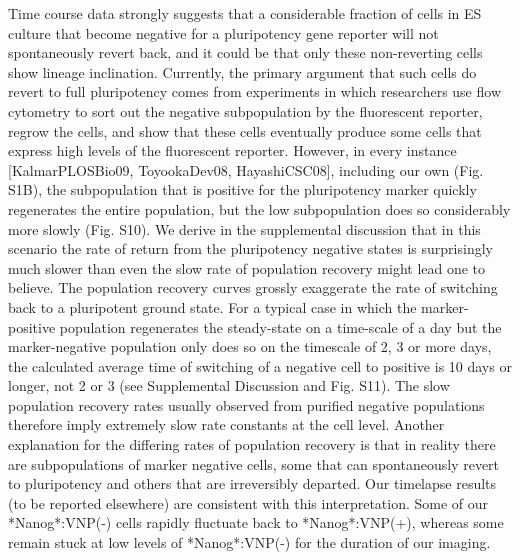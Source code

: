 \documentclass[aps,prl,twocolumn,superscriptaddress]{revtex4}
\begin{document}
Time course data strongly suggests that a considerable fraction of cells in ES culture that become negative for a pluripotency gene reporter will not spontaneously revert back, and it could be that only these non-reverting cells show lineage inclination. Currently, the primary argument that such cells do revert to full pluripotency comes from experiments in which researchers use flow cytometry to sort out the negative subpopulation by the fluorescent reporter, regrow the cells, and show that these cells eventually produce some cells that express high levels of the fluorescent reporter. However, in every instance [KalmarPLOSBio09, ToyookaDev08, HayashiCSC08], including our own (Fig. S1B), the subpopulation that is positive for the pluripotency marker quickly regenerates the entire population, but the low subpopulation does so considerably more slowly (Fig. S10). We derive in the supplemental discussion that in this scenario the rate of return from the pluripotency negative states is surprisingly much slower than even the slow rate of population recovery might lead one to believe. The population recovery curves grossly exaggerate the rate of switching back to a pluripotent ground state. For a typical case in which the marker-positive population regenerates the steady-state on a time-scale of a day but the marker-negative population only does so on the timescale of 2, 3 or more days, the calculated average time of switching of a negative cell to positive is 10 days or longer, not 2 or 3 (see Supplemental Discussion and Fig. S11). The slow population recovery rates usually observed from purified negative populations therefore imply extremely slow rate constants at the cell level. Another explanation for the differing rates of population recovery is that in reality there are subpopulations of marker negative cells, some that can spontaneously revert to pluripotency and others that are irreversibly departed.  Our timelapse results (to be reported elsewhere) are consistent with this interpretation. Some of our *Nanog*:VNP(-) cells rapidly fluctuate back to *Nanog*:VNP(+), whereas some remain stuck at low levels of *Nanog*:VNP(-) for the duration of our imaging. 
\end{document}
